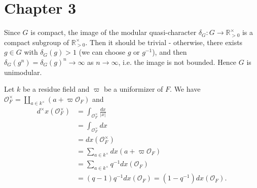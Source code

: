 \newpage
\section{Chapter 3}

\begin{problem} \notfinish
\end{problem}

\begin{problem}
Since $G$ is compact, the image of the modular quasi-character $\delta_{G}: G \to \mathbb{R}_{>0}^{\times}$ is a compact subgroup of $\mathbb{R}_{>0}^{\times}$.
Then it should be trivial - otherwise, there exists $g \in G$ with $\delta_{G}(g) > 1$ (we can choose $g$ or $g^{-1}$), and then $\delta_{G}(g^{n}) = \delta_{G}(g)^{n} \to \infty$
as $n\to\infty$, i.e. the image is not bounded.
Hence $G$ is unimodular.
\end{problem}

\begin{problem} \notfinish
\end{problem}

\begin{problem} \notfinish
\end{problem}

\begin{problem} \notfinish
\end{problem}

\begin{problem} \notfinish
\end{problem}

\begin{problem}
Let $k$ be a residue field and $\varpi$ be a uniformizer of $F$.
We have $\mathcal{O}_{F}^{\times} = \coprod_{a\in k^{\times}} (a + \varpi \mathcal{O}_{F})$ and
\begin{align*}
    d^{\times}x(\mathcal{O}_{F}^{\times}) &= \int_{\mathcal{O}_{F}^{\times}} \frac{dx}{|x|} \\
    &= \int_{\mathcal{O}_{F}^{\times}} dx \\
    &= dx(\mathcal{O}_{F}^{\times}) \\
    &= \sum_{a\in k^{\times}} dx(a + \varpi \mathcal{O}_{F}) \\
    &= \sum_{a\in k^{\times}} q^{-1}dx(\mathcal{O}_{F}) \\
    &= (q - 1)q^{-1}dx(\mathcal{O}_{F}) = (1 - q^{-1}) dx(\mathcal{O}_F).
\end{align*}
\end{problem}

